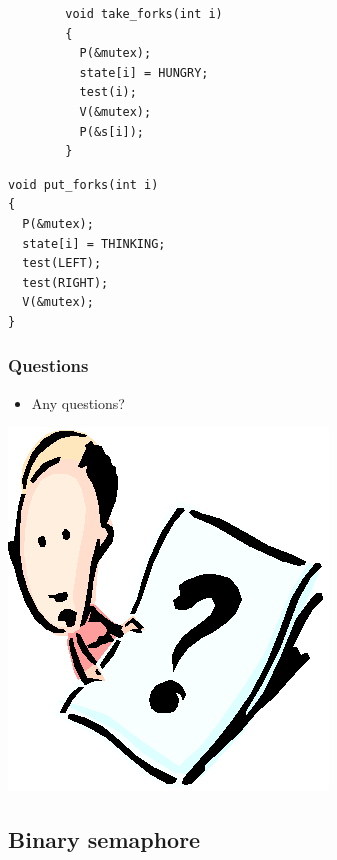 \documentclass[CJKutf8,xcolor=pdftex,dvipsnames,table]{beamer}
\begin{document}
\begin{CJK*}{UTF8}{song}
\begin{frame}[fragile]
  \pause

  \begin{minipage}[c]{0.5\textwidth}
\begin{lstlisting}
        void take_forks(int i)
        {
          P(&mutex);
          state[i] = HUNGRY;
          test(i);
          V(&mutex);
          P(&s[i]);
        }
\end{lstlisting}
    \end{minipage}%
    \begin{minipage}[c]{0.5\textwidth}
\begin{lstlisting}
void put_forks(int i)
{
  P(&mutex);
  state[i] = THINKING;
  test(LEFT);
  test(RIGHT);
  V(&mutex);
}
\end{lstlisting}
    \end{minipage}

\end{frame}

  \begin{frame}
  \frametitle{Questions}
  \begin{itemize}
  \item{Any questions?}
  \end{itemize}
  \begin{center}
    \includegraphics[scale=.5]{question}
  \end{center}
  \end{frame}

\subsection{Binary semaphore}


\end{CJK*}
\end{document}
